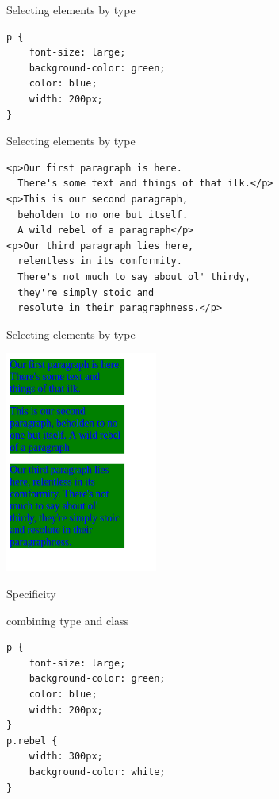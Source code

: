 \documentclass{beamer}
\begin{document}
\begin{frame}[fragile]{Selecting elements by type}
 \begin{block}{}
\begin{verbatim}
p {
    font-size: large;
    background-color: green;
    color: blue;
    width: 200px;
}
\end{verbatim}
\end{block}
\end{frame}

\begin{frame}[fragile,label={sec:orgheadline36}]{Selecting elements by type}
 \begin{block}{}
\begin{verbatim}
<p>Our first paragraph is here. 
  There's some text and things of that ilk.</p>
<p>This is our second paragraph, 
  beholden to no one but itself. 
  A wild rebel of a paragraph</p>
<p>Our third paragraph lies here, 
  relentless in its comformity. 
  There's not much to say about ol' thirdy, 
  they're simply stoic and 
  resolute in their paragraphness.</p>
\end{verbatim}
\end{block}
\end{frame}


\begin{frame}{Selecting elements by type}
\begin{block}{}
\includegraphics[width=5cm]{byType.png}
\end{block}
\end{frame}

\begin{frame}[fragile]{Specificity}
 \begin{block}{combining type and class}
\begin{verbatim}
p {
    font-size: large;
    background-color: green;
    color: blue;
    width: 200px;
}
p.rebel {
    width: 300px;
    background-color: white;
}
\end{verbatim}
\end{block}
\end{frame}
\end{document}

